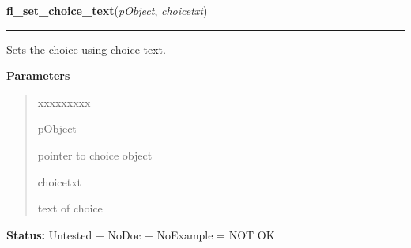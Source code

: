 \hspace{.8\funcindent}\begin{boxedminipage}{\funcwidth}

    \raggedright \textbf{fl\_set\_choice\_text}(\textit{pObject}, \textit{choicetxt})

    \vspace{-1.5ex}

    \rule{\textwidth}{0.5\fboxrule}
\setlength{\parskip}{2ex}
    Sets the choice using choice text.

\setlength{\parskip}{1ex}
      \textbf{Parameters}
      \vspace{-1ex}

      \begin{quote}
        \begin{Ventry}{xxxxxxxxx}

          \item[pObject]

          pointer to choice object

          \item[choicetxt]

          text of choice

        \end{Ventry}

      \end{quote}

\textbf{Status:} Untested + NoDoc + NoExample = NOT OK



    \end{boxedminipage}

    \label{xformslib:library:fl_get_choice}

    \vspace{0.5ex}

